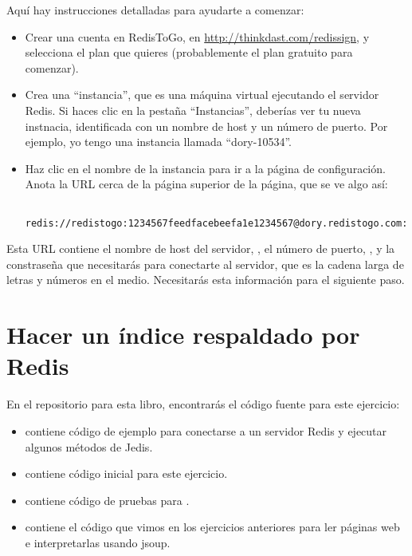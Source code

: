\documentclass[12pt]{book}
\theoremstyle{exercise}
\begin{document}

Aquí hay instrucciones detalladas para ayudarte a comenzar:

\begin{itemize}

\item Crear una cuenta en RedisToGo, en
  \url{http://thinkdast.com/redissign},
  y selecciona el plan que quieres (probablemente el plan gratuito para comenzar).

\item
  Crea una ``instancia'', que es una máquina virtual ejecutando el servidor
  Redis. Si haces clic en la pestaña ``Instancias'', deberías ver tu nueva
  instnacia, identificada con un nombre de host y un número de puerto. Por ejemplo,
  yo tengo una instancia llamada ``dory-10534''.

\item
  Haz clic en el nombre de la instancia para ir a la página de configuración. Anota
  la URL cerca de la página superior de la página, que se ve algo así:

  \begin{verbatim}
  redis://redistogo:1234567feedfacebeefa1e1234567@dory.redistogo.com:10534
  \end{verbatim}

\end{itemize}


Esta URL contiene el nombre de host del servidor, ,
el número de puerto, , y la constraseña que necesitarás para
conectarte al servidor, que es la cadena larga de letras y números en el
medio. Necesitarás esta información para el siguiente paso.


\section{Hacer un índice respaldado por Redis}
\label{hello-jedis}


En el repositorio para esta libro,
encontrarás el código fuente para este ejercicio:

\begin{itemize}

\item
   contiene código de ejemplo para conectarse a un
  servidor Redis y ejecutar algunos métodos de Jedis.

\item
   contiene código inicial para este ejercicio.

\item
   contiene código de pruebas para
  .

\item
   contiene el código que vimos en los ejercicios anteriores para
  ler páginas web e interpretarlas usando jsoup.

\end{itemize}
\end{document}
